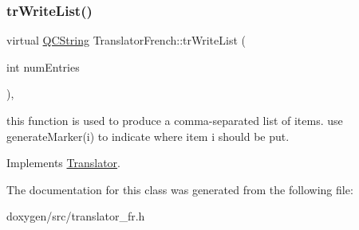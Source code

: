 \subsubsection{\texorpdfstring{trWriteList()}{trWriteList()}}
{\footnotesize\ttfamily virtual \mbox{\hyperlink{class_q_c_string}{Q\+C\+String}} Translator\+French\+::tr\+Write\+List (\begin{DoxyParamCaption}\item[{int}]{num\+Entries }\end{DoxyParamCaption})\hspace{0.3cm}{\ttfamily [inline]}, {\ttfamily [virtual]}}

this function is used to produce a comma-\/separated list of items. use generate\+Marker(i) to indicate where item i should be put. 

Implements \mbox{\hyperlink{class_translator}{Translator}}.



The documentation for this class was generated from the following file\+:\begin{DoxyCompactItemize}
\item 
doxygen/src/translator\+\_\+fr.\+h\end{DoxyCompactItemize}
